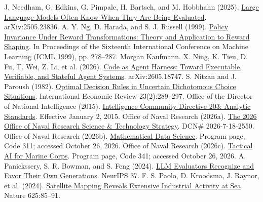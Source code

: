 \begin{thebibliography}{}
 J. Needham, G. Edkins, G. Pimpale, H. Bartsch, and M. Hobbhahn (2025). \href{https://arxiv.org/abs/2505.23836}{Large Language Models Often Know When They Are Being Evaluated}. arXiv:2505.23836.
 A. Y. Ng, D. Harada, and S. J. Russell (1999). \href{https://mlanthology.org/icml/1999/ng1999icml-policy/}{Policy Invariance Under Reward Transformations: Theory and Application to Reward Shaping}. In Proceedings of the Sixteenth International Conference on Machine Learning (ICML 1999), pp. 278--287. Morgan Kaufmann.
 X. Ning, K. Tieu, D. Fu, T. Wei, Z. Li, et al. (2026). \href{https://arxiv.org/abs/2605.18747}{Code as Agent Harness: Toward Executable, Verifiable, and Stateful Agent Systems}. arXiv:2605.18747.
 S. Nitzan and J. Paroush (1982). \href{https://doi.org/10.2307/2526438}{Optimal Decision Rules in Uncertain Dichotomous Choice Situations}. International Economic Review 23(2):289--297.
 Office of the Director of National Intelligence (2015). \href{https://www.dni.gov/files/documents/ICD/ICD-203.pdf}{Intelligence Community Directive 203: Analytic Standards}. Effective January 2, 2015.
 Office of Naval Research (2026a). \href{https://www.onr.navy.mil/media/document/office-naval-research-science-technology-strategy}{The 2026 Office of Naval Research Science \& Technology Strategy}. DCN\# 2026-7-18-2550.
 Office of Naval Research (2026b). \href{https://www.onr.navy.mil/organization/departments/code-31/division-311/mathematical-data-science}{Mathematical Data Science}. Program page, Code 311; accessed October 26, 2026.
 Office of Naval Research (2026c). \href{https://www.onr.navy.mil/organization/departments/code-34/division-341/tactical-ai-marine-corps}{Tactical AI for Marine Corps}. Program page, Code 341; accessed October 26, 2026.
 A. Panickssery, S. R. Bowman, and S. Feng (2024). \href{https://arxiv.org/abs/2404.13076}{LLM Evaluators Recognize and Favor Their Own Generations}. NeurIPS 37.
 F. S. Paolo, D. Kroodsma, J. Raynor, et al. (2024). \href{https://doi.org/10.1038/s41586-023-06825-8}{Satellite Mapping Reveals Extensive Industrial Activity at Sea}. Nature 625:85--91.

\end{thebibliography}
